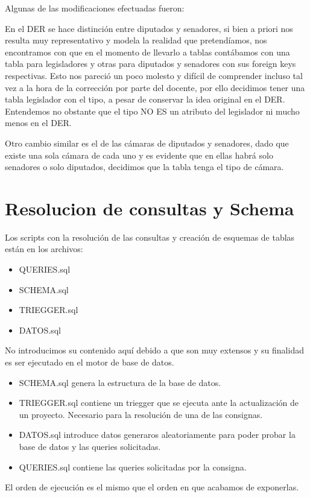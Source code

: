 \documentclass[10pt, a4paper]{article}
\begin{document}
Algunas de las modificaciones efectuadas fueron:

En el DER se hace distinci\'on entre diputados y senadores, si bien a priori nos resulta muy representativo y modela la realidad que pretend\'iamos, nos encontramos con que en el momento de llevarlo a tablas cont\'abamos con una tabla para legisladores y otras para diputados y senadores con sus foreign keys respectivas. Esto nos pareci\'o un poco molesto y dif\'icil de comprender incluso tal vez a la hora de la correcci\'on por parte del docente, por ello decidimos tener una tabla legislador con el tipo, a pesar de conservar la idea original en el DER. 
Entendemos no obstante que el tipo NO ES un atributo del legislador ni mucho menos en el DER.

Otro cambio similar es el de las c\'amaras de diputados y senadores, dado que existe una sola c\'amara de cada uno y es evidente que en ellas habr\'a solo senadores o solo diputados, decidimos que la tabla tenga el tipo de c\'amara.

\section{Resolucion de consultas y Schema}

Los scripts con la resoluci\'on de las consultas y creaci\'on de esquemas de tablas est\'an en los archivos:

\begin{itemize}

	\item QUERIES.sql
	\item SCHEMA.sql
	\item TRIEGGER.sql
	\item DATOS.sql

\end{itemize}

No introducimos su contenido aqu\'i debido a que son muy extensos y su finalidad es ser ejecutado en el motor de base de datos. 

\begin{itemize}
	\item SCHEMA.sql genera la estructura de la base de datos.
	\item TRIEGGER.sql contiene un triegger que se ejecuta ante la actualizaci\'on de un proyecto. Necesario para la resoluci\'on de una de las consignas.
	\item DATOS.sql introduce datos generaros aleatoriamente para poder probar la base de datos y las queries solicitadas.
	\item QUERIES.sql contiene las queries solicitadas por la consigna.
\end{itemize}
El orden de ejecuci\'on es el mismo que el orden en que acabamos de exponerlas.
\end{document}
